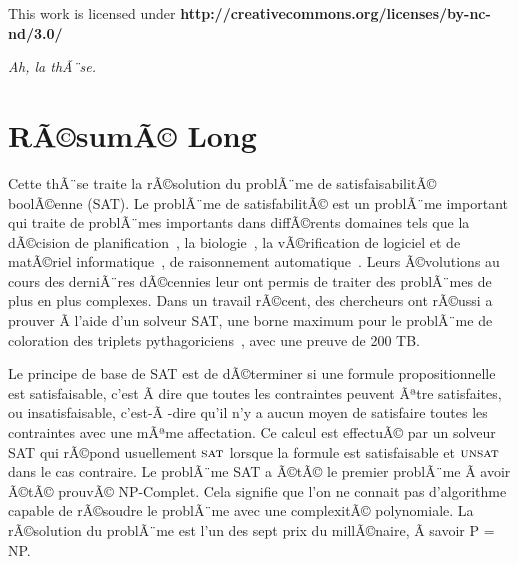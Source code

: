 ﻿\clearpage\null\vfill
\thispagestyle{empty}
\begin{minipage}[b]{.9\textwidth}
  \begin{center}
  \setlength{\parskip}{.5\baselineskip}
  {\color{phdcol0}%
   \ccLogo\hspace{.1cm}%
   \ccAttribution\hspace{.1cm}%
   \ccNonCommercial\hspace{.1cm}%
   \ccNoDerivatives}\hspace{.15cm}%
  \footnotesize%
  This work is licensed under {\color{phdcol1}\textbf{http://creativecommons.org/licenses/by-nc-nd/3.0/}}
  \end{center}
\end{minipage}
\vspace*{2\baselineskip}
\clearpage
\thispagestyle{empty}
\begin{flushright}
  \textit{Ah, la thÃ¨se.}
\end{flushright}
%
%
%
%
\chapter*{RÃ©sumÃ© Long}

Cette thÃ¨se traite la rÃ©solution du problÃ¨me de satisfaisabilitÃ© boolÃ©enne (SAT).
Le problÃ¨me de satisfabilitÃ© est un problÃ¨me important qui traite de problÃ¨mes importants dans diffÃ©rents domaines tels 
que la dÃ©cision de planification~\cite{planning_92}, la biologie~\cite{biology_06}, la vÃ©rification de logiciel et de 
matÃ©riel informatique~\cite{biere1999symbolic}, de raisonnement automatique~\cite{heule2016solving}.
Leurs Ã©volutions au cours des derniÃ¨res dÃ©cennies leur ont permis de traiter des problÃ¨mes de plus en plus complexes.
Dans un travail rÃ©cent, des chercheurs ont rÃ©ussi a prouver Ã  l'aide d'un solveur SAT, une borne maximum
pour le problÃ¨me de coloration des triplets pythagoriciens~\cite{heule2016solving}, avec une preuve de 200 TB.

Le principe de base de SAT est de dÃ©terminer si une formule propositionnelle
est satisfaisable, c'est Ã  dire que toutes les contraintes peuvent Ãªtre satisfaites,
ou insatisfaisable, c'est-Ã -dire qu'il n'y a aucun moyen de satisfaire toutes les contraintes avec une mÃªme affectation.
Ce calcul est effectuÃ© par un solveur SAT qui rÃ©pond usuellement $\textsc{sat}$ lorsque la formule est satisfaisable et $\textsc{unsat}$ dans le cas
contraire. Le problÃ¨me SAT a Ã©tÃ© le premier problÃ¨me Ã  avoir Ã©tÃ© prouvÃ© NP-Complet. Cela signifie que
l'on ne connait pas d'algorithme capable de rÃ©soudre le problÃ¨me avec une complexitÃ© polynomiale.
La rÃ©solution du problÃ¨me est l'un des sept prix du millÃ©naire, Ã  savoir P = NP.

